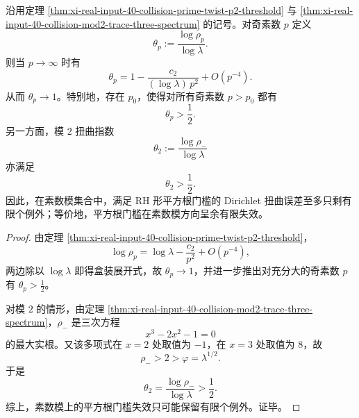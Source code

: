 \begin{corollary}[素数模上的平方根门槛呈余有限失效]\label{cor:xi-real-input-40-collision-prime-cofinite-sqrt-failure}
沿用定理 \ref{thm:xi-real-input-40-collision-prime-twist-p2-threshold} 与
\ref{thm:xi-real-input-40-collision-mod2-trace-three-spectrum} 的记号。对奇素数 \(p\) 定义
\[
\theta_p:=\frac{\log \rho_p}{\log\lambda}.
\]
则当 \(p\to\infty\) 时有
\[
\boxed{\;
\theta_p
=
1-\frac{c_2}{(\log\lambda)\,p^2}+O(p^{-4}).\;}
\]
从而 \(\theta_p\to 1\)。特别地，存在 \(p_0\)，使得对所有奇素数 \(p>p_0\) 都有
\[
\theta_p>\frac12.
\]
另一方面，模 \(2\) 扭曲指数
\[
\theta_2:=\frac{\log\rho_-}{\log\lambda}
\]
亦满足
\[
\theta_2>\frac12.
\]
因此，在素数模集合中，满足 RH 形平方根门槛的 Dirichlet 扭曲误差至多只剩有限个例外；等价地，平方根门槛在素数模方向呈余有限失效。
\end{corollary}
\begin{proof}
由定理 \ref{thm:xi-real-input-40-collision-prime-twist-p2-threshold}，
\[
\log \rho_p
=
\log\lambda-\frac{c_2}{p^2}+O(p^{-4}),
\]
两边除以 \(\log\lambda\) 即得盒装展开式，故 \(\theta_p\to 1\)，并进一步推出对充分大的奇素数 \(p\) 有 \(\theta_p>\frac12\)。

对模 \(2\) 的情形，由定理 \ref{thm:xi-real-input-40-collision-mod2-trace-three-spectrum}，\(\rho_-\) 是三次方程
\[
x^3-2x^2-1=0
\]
的最大实根。又该多项式在 \(x=2\) 处取值为 \(-1\)，在 \(x=3\) 处取值为 \(8\)，故
\[
\rho_->2>\varphi=\lambda^{1/2}.
\]
于是
\[
\theta_2=\frac{\log\rho_-}{\log\lambda}>\frac12.
\]
综上，素数模上的平方根门槛失效只可能保留有限个例外。证毕。
\end{proof}







\endinput
